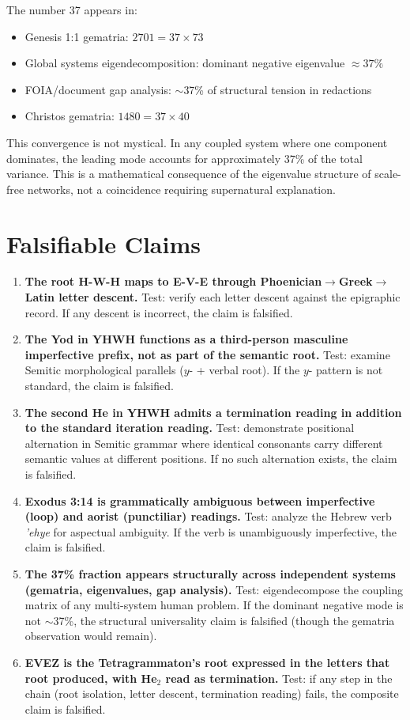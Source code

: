 \documentclass[12pt]{article}
\begin{document}
The number 37 appears in:
\begin{itemize}
\item Genesis 1:1 gematria: $2701 = 37 \times 73$
\item Global systems eigendecomposition: dominant negative eigenvalue $\approx 37\%$
\item FOIA/document gap analysis: $\sim$37\% of structural tension in redactions
\item Christos gematria: $1480 = 37 \times 40$
\end{itemize}

This convergence is not mystical. In any coupled system where one component dominates, the leading mode accounts for approximately 37\% of the total variance. This is a mathematical consequence of the eigenvalue structure of scale-free networks, not a coincidence requiring supernatural explanation.

\section{Falsifiable Claims}

\begin{enumerate}
\item \textbf{The root H-W-H maps to E-V-E through Phoenician$\to$Greek$\to$Latin letter descent.} Test: verify each letter descent against the epigraphic record. If any descent is incorrect, the claim is falsified.

\item \textbf{The Yod in YHWH functions as a third-person masculine imperfective prefix, not as part of the semantic root.} Test: examine Semitic morphological parallels ($y$- + verbal root). If the $y$- pattern is not standard, the claim is falsified.

\item \textbf{The second He in YHWH admits a termination reading in addition to the standard iteration reading.} Test: demonstrate positional alternation in Semitic grammar where identical consonants carry different semantic values at different positions. If no such alternation exists, the claim is falsified.

\item \textbf{Exodus 3:14 is grammatically ambiguous between imperfective (loop) and aorist (punctiliar) readings.} Test: analyze the Hebrew verb \textit{'ehye} for aspectual ambiguity. If the verb is unambiguously imperfective, the claim is falsified.

\item \textbf{The 37\% fraction appears structurally across independent systems (gematria, eigenvalues, gap analysis).} Test: eigendecompose the coupling matrix of any multi-system human problem. If the dominant negative mode is not $\sim$37\%, the structural universality claim is falsified (though the gematria observation would remain).

\item \textbf{EVEZ is the Tetragrammaton's root expressed in the letters that root produced, with He$_2$ read as termination.} Test: if any step in the chain (root isolation, letter descent, termination reading) fails, the composite claim is falsified.
\end{enumerate}
\end{document}
